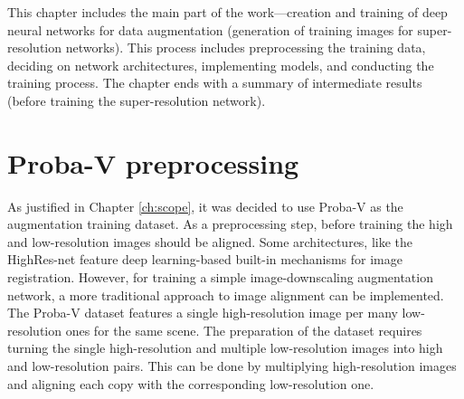This chapter includes the main part of the work---creation and training of deep neural networks for data augmentation (generation of training images for super-resolution networks).
This process includes preprocessing the training data, deciding on network architectures, implementing models, and conducting the training process.
The chapter ends with a summary of intermediate results (before training the super-resolution network).

\section{Proba-V preprocessing}
As justified in Chapter \ref{ch:scope}, it was decided to use Proba-V as the augmentation training dataset.
As a preprocessing step, before training the high and low-resolution images should be aligned.
Some architectures, like the HighRes-net feature deep learning-based built-in mechanisms for image registration.
However, for training a simple image-downscaling augmentation network, a more traditional approach to image alignment can be implemented.
The Proba-V dataset features a single high-resolution image per many low-resolution ones for the same scene.
The preparation of the dataset requires turning the single high-resolution and multiple low-resolution images into high and low-resolution pairs.
This can be done by multiplying high-resolution images and aligning each copy with the corresponding low-resolution one.

